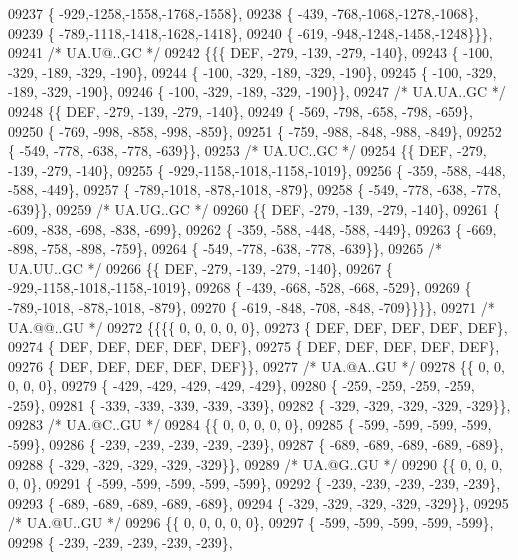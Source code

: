 \begin{DoxyCode}
09237 \{ -929,-1258,-1558,-1768,-1558\},
09238 \{ -439, -768,-1068,-1278,-1068\},
09239 \{ -789,-1118,-1418,-1628,-1418\},
09240 \{ -619, -948,-1248,-1458,-1248\}\}\},
09241 \textcolor{comment}{/* UA.U@..GC */}
09242 \{\{\{  DEF, -279, -139, -279, -140\},
09243 \{ -100, -329, -189, -329, -190\},
09244 \{ -100, -329, -189, -329, -190\},
09245 \{ -100, -329, -189, -329, -190\},
09246 \{ -100, -329, -189, -329, -190\}\},
09247 \textcolor{comment}{/* UA.UA..GC */}
09248 \{\{  DEF, -279, -139, -279, -140\},
09249 \{ -569, -798, -658, -798, -659\},
09250 \{ -769, -998, -858, -998, -859\},
09251 \{ -759, -988, -848, -988, -849\},
09252 \{ -549, -778, -638, -778, -639\}\},
09253 \textcolor{comment}{/* UA.UC..GC */}
09254 \{\{  DEF, -279, -139, -279, -140\},
09255 \{ -929,-1158,-1018,-1158,-1019\},
09256 \{ -359, -588, -448, -588, -449\},
09257 \{ -789,-1018, -878,-1018, -879\},
09258 \{ -549, -778, -638, -778, -639\}\},
09259 \textcolor{comment}{/* UA.UG..GC */}
09260 \{\{  DEF, -279, -139, -279, -140\},
09261 \{ -609, -838, -698, -838, -699\},
09262 \{ -359, -588, -448, -588, -449\},
09263 \{ -669, -898, -758, -898, -759\},
09264 \{ -549, -778, -638, -778, -639\}\},
09265 \textcolor{comment}{/* UA.UU..GC */}
09266 \{\{  DEF, -279, -139, -279, -140\},
09267 \{ -929,-1158,-1018,-1158,-1019\},
09268 \{ -439, -668, -528, -668, -529\},
09269 \{ -789,-1018, -878,-1018, -879\},
09270 \{ -619, -848, -708, -848, -709\}\}\}\},
09271 \textcolor{comment}{/* UA.@@..GU */}
09272 \{\{\{\{    0,    0,    0,    0,    0\},
09273 \{  DEF,  DEF,  DEF,  DEF,  DEF\},
09274 \{  DEF,  DEF,  DEF,  DEF,  DEF\},
09275 \{  DEF,  DEF,  DEF,  DEF,  DEF\},
09276 \{  DEF,  DEF,  DEF,  DEF,  DEF\}\},
09277 \textcolor{comment}{/* UA.@A..GU */}
09278 \{\{    0,    0,    0,    0,    0\},
09279 \{ -429, -429, -429, -429, -429\},
09280 \{ -259, -259, -259, -259, -259\},
09281 \{ -339, -339, -339, -339, -339\},
09282 \{ -329, -329, -329, -329, -329\}\},
09283 \textcolor{comment}{/* UA.@C..GU */}
09284 \{\{    0,    0,    0,    0,    0\},
09285 \{ -599, -599, -599, -599, -599\},
09286 \{ -239, -239, -239, -239, -239\},
09287 \{ -689, -689, -689, -689, -689\},
09288 \{ -329, -329, -329, -329, -329\}\},
09289 \textcolor{comment}{/* UA.@G..GU */}
09290 \{\{    0,    0,    0,    0,    0\},
09291 \{ -599, -599, -599, -599, -599\},
09292 \{ -239, -239, -239, -239, -239\},
09293 \{ -689, -689, -689, -689, -689\},
09294 \{ -329, -329, -329, -329, -329\}\},
09295 \textcolor{comment}{/* UA.@U..GU */}
09296 \{\{    0,    0,    0,    0,    0\},
09297 \{ -599, -599, -599, -599, -599\},
09298 \{ -239, -239, -239, -239, -239\},

\end{DoxyCode}
